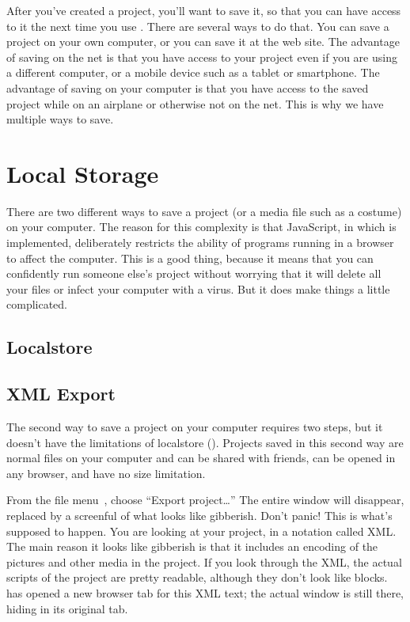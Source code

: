 \documentclass{report}
\begin{document}
After you've created a project, you'll want to save it, so that you can have access to it the next time you use \Snap{}. There are several ways to do that. You can save a project on your own computer, or you can save it at the \Snap{} web site. The advantage of saving on the net is that you have access to your project even if you are using a different computer, or a mobile device such as a tablet or smartphone. The advantage of saving on your computer is that you have access to the saved project while on an airplane or otherwise not on the net. This is why we have multiple ways to save.

\section{Local Storage}

There are two different ways to save a project (or a media file such as a costume) on your computer. The reason for this complexity is that JavaScript, in which \Snap{} is implemented, deliberately restricts the ability of programs running in a browser to affect the computer. This is a good thing, because it means that you can confidently run someone else's \Snap{} project without worrying that it will delete all your files or infect your computer with a virus. But it does make things a little complicated.

\subsection{Localstore}

{\Huge \TODO{}}

\subsection{XML Export}

The second way to save a project on your computer requires two steps, but it doesn't have the limitations of localstore (). Projects saved in this second way are normal files on your computer and can be shared with friends, can be opened in any browser, and have no size limitation.

From the file menu~, choose ``Export project\ldots'' The entire \Snap{} window will disappear, replaced by a screenful of what looks like gibberish. Don't panic! This is what's supposed to happen. You are looking at your project, in a notation called XML. The main reason it looks like gibberish is that it includes an encoding of the pictures and other media in the project. If you look through the XML, the actual scripts of the project are pretty readable, although they don't look like \Snap{} blocks. \Snap{} has opened a new browser tab for this XML text; the actual \Snap{} window is still there, hiding in its original tab.
\end{document}
